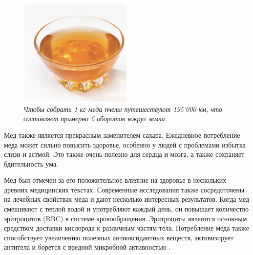 \begin{figure}
\includegraphics[width=0.5\textwidth]{img/honey.png}
    \caption{\textit{Чтобы собрать 1 кг меда пчелы путешествуют 195'000 км, что состовляет примерно 5 оборотов вокруг земли.}}
\end{figure}
Мед также является прекрасным заменителем сахара. Ежедневное потребление меда может сильно повысить здоровье, особенно у людей с проблемами избытка слизи и астмой. Это также очень полезно для сердца и мозга, а также сохраняет бдительность ума.

Мед был отмечен за его положительное влияние на здоровье в нескольких древних медицинских текстах. Современные исследования также сосредоточены на лечебных свойствах меда и дают несколько интересных результатов. Когда мед смешивают с теплой водой и употребляют каждый день, он повышает количество эритроцитов (RBC) в системе кровообращения. Эритроциты являются основным средством доставки кислорода к различным частям тела. Потребление меда также способствует увеличению полезных антиоксидантных веществ, активизирует антитела и борется с вредной микробной активностью \cite{EffectHoney} \cite{HoneyMicrobial}.




